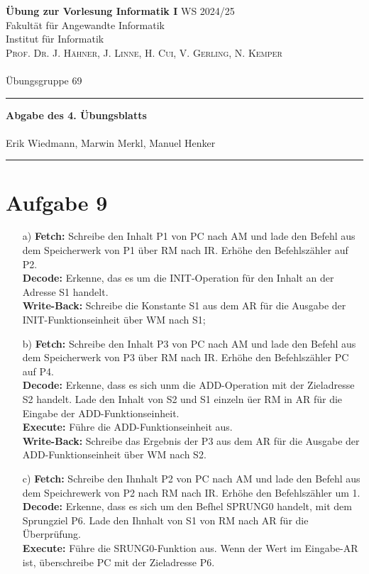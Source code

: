 \documentclass[paper=a4, %
         fontsize=10pt,  %
         oneside,        %
         headsepline,    %
         notitlepage     %
]{scrartcl}              %
\newcommand{\ownline}{\vspace{.7em}\hrule\vspace{.7em}}
\newcommand{\aufgabe}[1]{\section*{Aufgabe #1}}
\begin{document}
\textbf{Übung zur Vorlesung Informatik I} \hfill{WS 2024/25} \\  
Fakultät für Angewandte Informatik \\
Institut für Informatik \\
\textsc{Prof. Dr. J. Hähner, J. Linne, H. Cui, V. Gerling, N. Kemper} \\
\mbox{} \\
{\large Übungsgruppe 69} %
\ownline
\begin{center}
	{\LARGE \textbf{Abgabe des 4. Übungsblatts}} \\ %
	\mbox{} \\
	{\large Erik Wiedmann, Marwin Merkl, Manuel Henker} \\ %
\end{center}
\ownline



\aufgabe{9}
\begin{enumerate}
	\item[a)]
		\textbf{Fetch:} Schreibe den Inhalt P1 von PC nach AM
        und lade den Befehl aus dem Speicherwerk von P1 über RM nach IR.
        Erhöhe den Befehlszähler auf P2.\\
        \textbf{Decode:} Erkenne, das es um die INIT-Operation für den Inhalt an der Adresse S1 handelt.\\
        \textbf{Write-Back:} Schreibe die Konstante S1 aus dem AR für die Ausgabe der INIT-Funktionseinheit über WM nach S1;
	\item[b)]
        \textbf{Fetch:} Schreibe den Inhalt P3 von PC nach AM
        und lade den Befehl aus dem Speicherwerk von P3 über RM nach IR. Erhöhe den Befehlszähler PC auf P4.\\
        \textbf{Decode:} Erkenne, dass es sich unm die ADD-Operation mit der Zieladresse S2 handelt.
        Lade den Inhalt von S2 und S1 einzeln üer RM in AR für die Eingabe der ADD-Funktionseinheit.\\
        \textbf{Execute:} Führe die ADD-Funktionseinheit aus.\\
        \textbf{Write-Back:} Schreibe das Ergebnis der P3 aus dem AR für die Ausgabe der ADD-Funktionseinheit über WM nach S2.
	\item[c)]
        \textbf{Fetch:} Schreibe den Ihnhalt P2 von PC nach AM
		und lade den Befehl aus dem Speichrewerk von P2 nach RM nach IR.
		Erhöhe den Befehlszähler um 1.\\
		\textbf{Decode:} Erkenne, dass es sich um den Befhel SPRUNG0 handelt,
		mit dem Sprungziel P6.
		Lade den Ihnhalt von S1 von RM nach AR für die Überprüfung.\\
		\textbf{Execute:} Führe die SRUNG0-Funktion aus. Wenn der Wert im Eingabe-AR ist, überschreibe PC mit der Zieladresse P6.\\
\end{enumerate}
\end{document}
